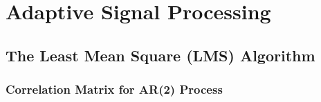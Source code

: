 \documentclass[main.tex]{subfiles}
\begin{document}
\section{Adaptive Signal Processing}

\subsection{The Least Mean Square (LMS) Algorithm}
\subsubsection{Correlation Matrix for AR(2) Process}
 
\end{document}
